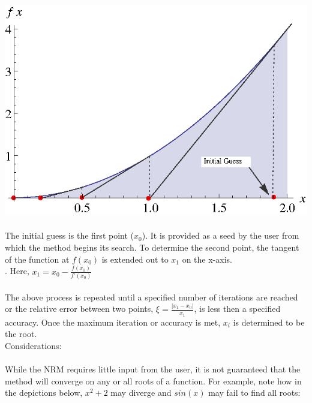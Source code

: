 \documentclass{report}
\begin{document}
\begin{enumerate}
\\
\\\includegraphics[scale=1.2]{newtonraphson.eps}
\\
\\The initial guess is the first point ($x_0$). It is provided as a seed by the user from which the method begins its search. To determine the second point, the tangent of the function at $f(x_0)$ is extended out to $x_1$ on the x-axis. 
\\.\hspace{30 mm} Here, $\displaystyle x_1 = x_0 - \frac{f(x_0)}{f'(x_0)}$  
\\
\\ The above process is repeated until a specified number of iterations are reached or the relative error between two points, $\displaystyle \xi = \frac{\left|x_1-x_0\right|}{x_1}$, is less then a specified accuracy. Once the maximum iteration or accuracy is met, $x_i$ is determined to be the root.
\\
Considerations: 
\\
\\While the NRM requires little input from the user, it is not guaranteed that the method will converge on any or all roots of a function. For example, note how in the depictions below, $x^2+2$ may diverge and $sin(x)$ may fail to find all roots:
\\

\end{enumerate}
\end{document}

